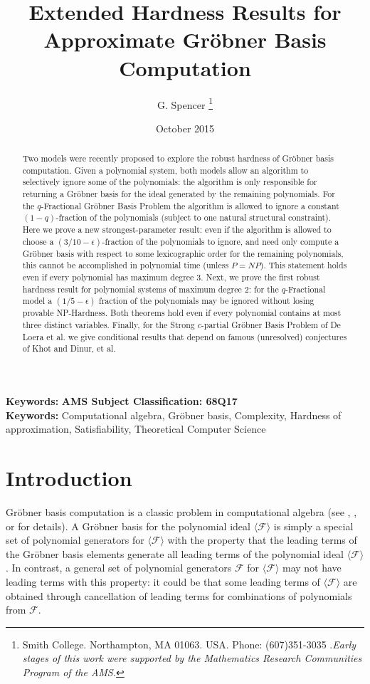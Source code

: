 \documentclass{article}
\title{Extended
Hardness Results for\\
 Approximate Gr\"{o}bner Basis Computation}
\author{G. Spencer \thanks{Smith College. Northampton, MA 01063. USA. Phone: (607)351-3035 .\textit{Early stages of this work were supported by the Mathematics Research Communities Program of the AMS.}}}
\date{October 2015}
\begin{document}
\maketitle

\begin{abstract}
Two models were recently proposed to explore the robust hardness of Gr\"{o}bner basis computation. Given a polynomial system, both models allow an algorithm to selectively ignore some of the polynomials: the algorithm is only responsible for returning a Gr\"{o}bner basis for the ideal generated by the remaining polynomials. For the $q$-Fractional Gr\"{o}bner Basis Problem the algorithm is allowed to ignore a constant $(1-q)$-fraction of the polynomials (subject to one natural structural constraint). Here we prove a new strongest-parameter result: even if the algorithm is allowed to choose a $(3/10-\epsilon)$-fraction of the polynomials to ignore, and need only compute a Gr\"{o}bner basis with respect to some lexicographic order for the remaining polynomials, this cannot be accomplished in polynomial time (unless $P=NP$). This statement holds even if every polynomial has maximum degree 3. Next, we prove the first robust hardness result for polynomial systems of maximum degree 2: for the $q$-Fractional model a $(1/5-\epsilon)$ fraction of the polynomials may be ignored without losing provable NP-Hardness. Both theorems hold even if every polynomial contains at most three distinct variables. Finally, for the Strong $c$-partial Gr\"{o}bner Basis Problem of De Loera et al. we give conditional results that depend on famous (unresolved) conjectures of Khot and Dinur, et al.



\end{abstract}

\noindent \textbf{Keywords:}
\textbf{AMS Subject Classification: 68Q17}\\
\noindent \textbf{Keywords:} Computational algebra, Gr\"{o}bner basis, Complexity, Hardness of approximation, Satisfiability, Theoretical Computer Science 


\section{Introduction}
Gr\"{o}bner basis computation is a classic problem in computational algebra (see \cite{sturmfels2005grobner}, \cite{Cox}, or \cite{Laur} for details). A Gr\"{o}bner basis for the polynomial ideal $\langle \mathcal{F}\rangle$ is simply a special set of polynomial generators for $\langle \mathcal{F}\rangle$ with the property that the leading terms of the Gr\"{o}bner basis elements generate all leading terms of the polynomial ideal $\langle \mathcal{F}\rangle$. In contrast, a general set of polynomial generators $\mathcal{F}$ for $\langle \mathcal{F}\rangle$ may not have leading terms with this property: it could be that some leading terms of $\langle \mathcal{F}\rangle$ are obtained through cancellation of leading terms for combinations of polynomials from $\mathcal{F}$.
\end{document}
